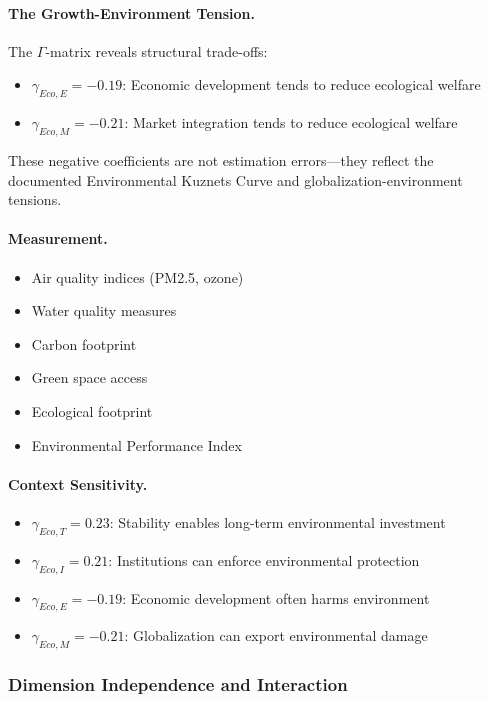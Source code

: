 \paragraph{The Growth-Environment Tension.}
The $\Gamma$-matrix reveals structural trade-offs:
\begin{itemize}
\item $\gamma_{Eco,E} = -0.19$: Economic development tends to reduce ecological welfare
\item $\gamma_{Eco,M} = -0.21$: Market integration tends to reduce ecological welfare
\end{itemize}

These negative coefficients are not estimation errors---they reflect 
the documented Environmental Kuznets Curve and globalization-environment tensions.

\paragraph{Measurement.}
\begin{itemize}
\item Air quality indices (PM2.5, ozone)
\item Water quality measures
\item Carbon footprint
\item Green space access
\item Ecological footprint
\item Environmental Performance Index
\end{itemize}

\paragraph{Context Sensitivity.}
\begin{itemize}
\item $\gamma_{Eco,T} = 0.23$: Stability enables long-term environmental investment
\item $\gamma_{Eco,I} = 0.21$: Institutions can enforce environmental protection
\item $\gamma_{Eco,E} = -0.19$: Economic development often harms environment
\item $\gamma_{Eco,M} = -0.21$: Globalization can export environmental damage
\end{itemize}

\subsubsection{Dimension Independence and Interaction}

